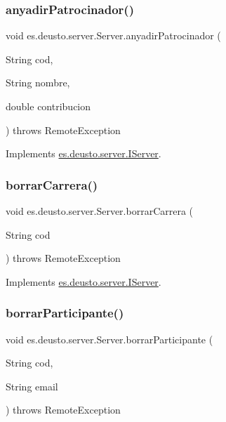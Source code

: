 \subsubsection{\texorpdfstring{anyadirPatrocinador()}{anyadirPatrocinador()}}
{\footnotesize\ttfamily void es.\+deusto.\+server.\+Server.\+anyadir\+Patrocinador (\begin{DoxyParamCaption}\item[{String}]{cod,  }\item[{String}]{nombre,  }\item[{double}]{contribucion }\end{DoxyParamCaption}) throws Remote\+Exception}



Implements \mbox{\hyperlink{interfacees_1_1deusto_1_1server_1_1_i_server_a50aa44ec5681089479d0793086a748a1}{es.\+deusto.\+server.\+I\+Server}}.

\mbox{\label{classes_1_1deusto_1_1server_1_1_server_a0a3160bdb7bfaab43143f1b0e68aee51}} 
\subsubsection{\texorpdfstring{borrarCarrera()}{borrarCarrera()}}
{\footnotesize\ttfamily void es.\+deusto.\+server.\+Server.\+borrar\+Carrera (\begin{DoxyParamCaption}\item[{String}]{cod }\end{DoxyParamCaption}) throws Remote\+Exception}



Implements \mbox{\hyperlink{interfacees_1_1deusto_1_1server_1_1_i_server_aaf52191bb3f870f0fcbdd58ffa7bd9c7}{es.\+deusto.\+server.\+I\+Server}}.

\mbox{\label{classes_1_1deusto_1_1server_1_1_server_a60cba3edcdffc7f50d4fa1f55b54ce76}} 
\subsubsection{\texorpdfstring{borrarParticipante()}{borrarParticipante()}}
{\footnotesize\ttfamily void es.\+deusto.\+server.\+Server.\+borrar\+Participante (\begin{DoxyParamCaption}\item[{String}]{cod,  }\item[{String}]{email }\end{DoxyParamCaption}) throws Remote\+Exception}



